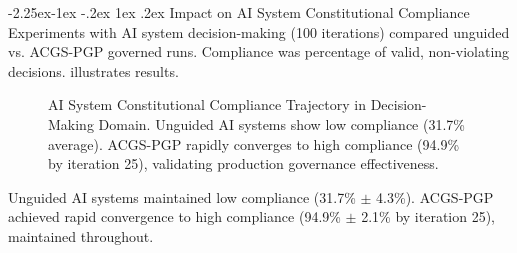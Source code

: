 \documentclass[manuscript,screen,9pt]{acmart}
\makeatletter
\renewcommand\subsection{\@startsection{subsection}{2}{\z@}%
  {-2.25ex\@plus -1ex \@minus -.2ex}%
  {1ex \@plus .2ex}%
  {\normalfont\large\bfseries}}
\makeatother
\begin{document}
\subsection{Impact on AI System Constitutional Compliance}
\label{subsec:impact_compliance}
Experiments with AI system decision-making (100 iterations) compared unguided vs. ACGS-PGP governed runs. Compliance was percentage of valid, non-violating decisions.  illustrates results.
\FloatBarrier %
\begin{figure}[!htb]
\centering
\caption[AI System Constitutional Compliance Trajectory]{AI System Constitutional Compliance Trajectory in Decision-Making Domain. Unguided AI systems show low compliance (31.7\% average). ACGS-PGP rapidly converges to high compliance (94.9\% by iteration 25), validating production governance effectiveness.}
\label{fig:compliance_over_generations}
\end{figure}
Unguided AI systems maintained low compliance (31.7\% $\pm$ 4.3\%). ACGS-PGP achieved rapid convergence to high compliance (94.9\% $\pm$ 2.1\% by iteration 25), maintained throughout.
\end{document}
